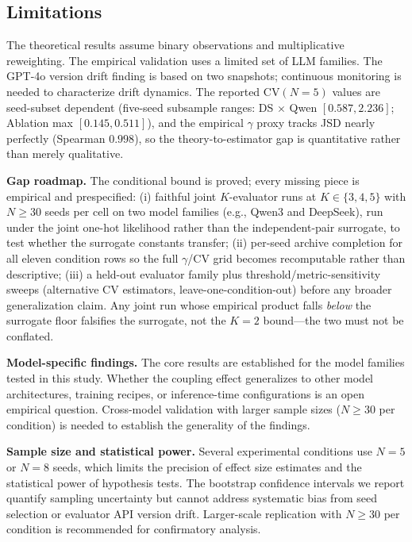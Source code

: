 \documentclass[11pt]{article}
\begin{document}
\subsection{Limitations} The theoretical results assume binary observations and multiplicative reweighting. The empirical validation uses a limited set of LLM families. The GPT-4o version drift finding is based on two snapshots; continuous monitoring is needed to characterize drift dynamics. The reported $\mathrm{CV}(N{=}5)$ values are seed-subset dependent (five-seed subsample ranges: DS $\times$ Qwen $[0.587, 2.236]$; Ablation max $[0.145, 0.511]$), and the empirical $\gamma$ proxy tracks JSD nearly perfectly (Spearman $0.998$), so the theory-to-estimator gap is quantitative rather than merely qualitative.

\textbf{Gap roadmap.} The conditional bound is proved; every missing piece is empirical and prespecified: (i) faithful joint $K$-evaluator runs at $K{\in}\{3,4,5\}$ with $N{\geq}30$ seeds per cell on two model families (e.g., Qwen3 and DeepSeek), run under the joint one-hot likelihood rather than the independent-pair surrogate, to test whether the surrogate constants transfer; (ii) per-seed archive completion for all eleven condition rows so the full $\gamma$/CV grid becomes recomputable rather than descriptive; (iii) a held-out evaluator family plus threshold/metric-sensitivity sweeps (alternative CV estimators, leave-one-condition-out) before any broader generalization claim. Any joint run whose empirical product falls \emph{below} the surrogate floor falsifies the surrogate, not the $K{=}2$ bound---the two must not be conflated.



\textbf{Model-specific findings.} The core results are established for the model families tested in this study. Whether the coupling effect generalizes to other model architectures, training recipes, or inference-time configurations is an open empirical question. Cross-model validation with larger sample sizes ($N{\geq}30$ per condition) is needed to establish the generality of the findings.

\textbf{Sample size and statistical power.} Several experimental conditions use $N{=}5$ or $N{=}8$ seeds, which limits the precision of effect size estimates and the statistical power of hypothesis tests. The bootstrap confidence intervals we report quantify sampling uncertainty but cannot address systematic bias from seed selection or evaluator API version drift. Larger-scale replication with $N{\geq}30$ per condition is recommended for confirmatory analysis.
\end{document}
